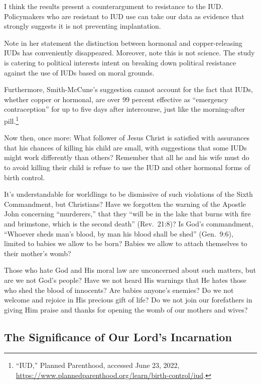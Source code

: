 \documentclass[
]{book}
\begin{document}
I think the results present a counterargument to resistance to the IUD. Policymakers who are resistant to IUD use can take our data as evidence that strongly suggests it is not preventing implantation.

Note in her statement the distinction between hormonal and copper-releasing IUDs has conveniently disappeared. Moreover, note this is not science. The study is catering to political interests intent on breaking down political resistance against the use of IUDs based on moral grounds.

Furthermore, Smith-McCune's suggestion cannot account for the fact that IUDs, whether copper or hormonal, are over 99 percent effective as ``emergency contraception'' for up to five days after intercourse, just like the morning-after pill.\footnote{``IUD,'' Planned Parenthood, accessed June 23, 2022, \url{https://www.plannedparenthood.org/learn/birth-control/iud}.}

Now then, once more: What follower of Jesus Christ is satisfied with assurances that his chances of killing his child are small, with suggestions that some IUDs might work differently than others? Remember that all he and his wife must do to avoid killing their child is refuse to use the IUD and other hormonal forms of birth control.

It's understandable for worldlings to be dismissive of such violations of the Sixth Commandment, but Christians? Have we forgotten the warning of the Apostle John concerning ``murderers,'' that they ``will be in the lake that burns with fire and brimstone, which is the second death'' (Rev.~21:8)? Is God's commandment, ``Whoever sheds man's blood, by man his blood shall be shed'' (Gen.~9:6), limited to babies we allow to be born? Babies we allow to attach themselves to their mother's womb?

Those who hate God and His moral law are unconcerned about such matters, but are we not God's people? Have we not heard His warnings that He hates those who shed the blood of innocents? Are babies anyone's enemies? Do we not welcome and rejoice in His precious gift of life? Do we not join our forefathers in giving Him praise and thanks for opening the womb of our mothers and wives?

\hypertarget{the-significance-of-our-lords-incarnation}{%
\subsection{The Significance of Our Lord's Incarnation}\label{the-significance-of-our-lords-incarnation}}
\end{document}
